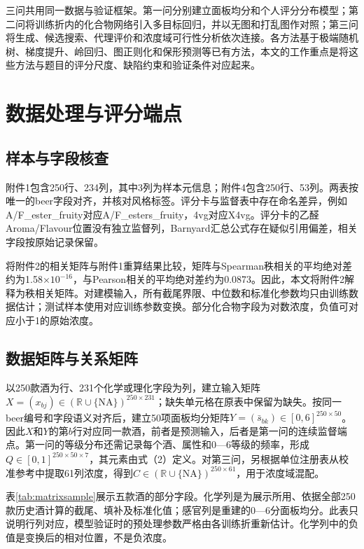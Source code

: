 \documentclass{mathorcup-journal}
\begin{document}
三问共用同一数据与验证框架。第一问分别建立面板均分和个人评分分布模型；第二问将训练折内的化合物网络引入多目标回归，并以无图和打乱图作对照；第三问将生成、候选搜索、代理评价和浓度域可行性分析依次连接。各方法基于极端随机树、梯度提升、岭回归、图正则化和保形预测等已有方法\cite{ref3}\cite{ref4}\cite{ref5}\cite{ref6}\cite{ref7}，本文的工作重点是将这些方法与题目的评分尺度、缺陷约束和验证条件对应起来。


\section{数据处理与评分端点}

\subsection{样本与字段核查}

附件1包含250行、234列，其中3列为样本元信息；附件4包含250行、53列。两表按唯一的beer字段对齐，并核对风格标签。评分卡与监督表中存在命名差异，例如A/F\_ester\_fruity对应A/F\_esters\_fruity，4vg对应X4vg。评分卡的乙醛Aroma/Flavour位置没有独立监督列，Barnyard汇总公式存在疑似引用偏差，相关字段按原始记录保留。


将附件2的相关矩阵与附件1重算结果比较，矩阵与Spearman秩相关的平均绝对差约为1.58×$10^{-16}$，与Pearson相关的平均绝对差约为0.0873。因此，本文将附件2解释为秩相关矩阵。对建模输入，所有截尾界限、中位数和标准化参数均只由训练数据估计；测试样本使用对应训练参数变换。部分化合物字段为对数浓度，负值可对应小于1的原始浓度。



\subsection{数据矩阵与关系矩阵}

以250款酒为行、231个化学或理化字段为列，建立输入矩阵$X=(x_{bj})\in(\mathbb R\cup\{\mathrm{NA}\})^{250\times231}$；缺失单元格在原表中保留为缺失。按同一beer编号和字段语义对齐后，建立50项面板均分矩阵$Y=(\bar s_{bk})\in[0,6]^{250\times50}$。因此$X$和$Y$的第$b$行对应同一款酒，前者是预测输入，后者是第一问的连续监督端点。第一问的等级分布还需记录每个酒、属性和0—6等级的频率，形成$Q\in[0,1]^{250\times50\times7}$，其元素由式（2）定义。对第三问，另根据单位注册表从校准参考中提取61列浓度，得到$C\in(\mathbb R\cup\{\mathrm{NA}\})^{250\times61}$，用于浓度域混配。

表\ref{tab:matrixsample}展示五款酒的部分字段。化学列是为展示所用、依据全部250款历史酒计算的截尾、填补及标准化值；感官列是重建的0—6分面板均分。此表只说明行列对应，模型验证时的预处理参数严格由各训练折重新估计。化学列中的负值是变换后的相对位置，不是负浓度。
\end{document}
